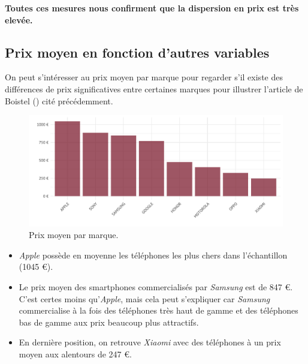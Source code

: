 \documentclass[
  12pt,
]{report}
\begin{document}
\textbf{Toutes ces mesures nous confirment que la dispersion en prix est
très elevée.}

\subsection{Prix moyen en fonction d'autres
variables}\label{prix-moyen-en-fonction-dautres-variables}

On peut s'intéresser au prix moyen par marque pour regarder s'il existe
des différences de prix significatives entre certaines marques pour
illustrer l'article de Boistel () cité
précédemment.

\begin{figure}[H]

{\centering \includegraphics{report_files/figure-pdf/fig_mean_price-1.pdf}

}

\caption{Prix moyen par marque.}

\end{figure}%

\begin{itemize}
\item
  \emph{Apple} possède en moyenne les téléphones les plus chers dans
  l'échantillon (1045 €).
\item
  Le prix moyen des smartphones commercialisés par \emph{Samsung} est de
  847 €. C'est certes moins qu'\emph{Apple}, mais cela peut s'expliquer
  car \emph{Samsung} commercialise à la fois des téléphones très haut de
  gamme et des téléphones bas de gamme aux prix beaucoup plus
  attractifs.
\item
  En dernière position, on retrouve \emph{Xiaomi} avec des téléphones à
  un prix moyen aux alentours de 247 €.
\end{itemize}

\newpage
\end{document}
